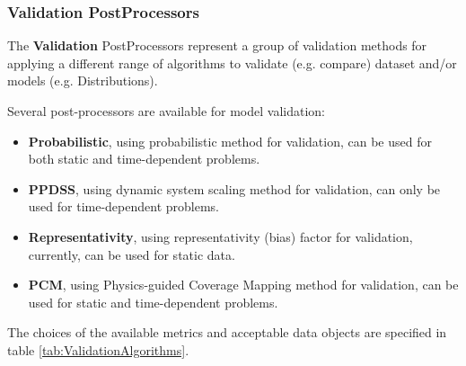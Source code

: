 \subsubsection{Validation PostProcessors}
\label{subsubsec:Validation}

The \textbf{Validation} PostProcessors represent a group of validation methods
for applying a different range of algorithms to validate (e.g. compare)
dataset and/or models (e.g. Distributions).

Several post-processors are available for model validation:
\begin{itemize}
  \item  \textbf{Probabilistic}, using probabilistic method for validation, can be used for both static and time-dependent problems.
  \item  \textbf{PPDSS}, using dynamic system scaling method for validation, can only be used for time-dependent problems.
  \item  \textbf{Representativity}, using representativity (bias) factor for validation, currently, can be used for static data.
  \item  \textbf{PCM}, using Physics-guided Coverage Mapping method for validation, can be used for static and time-dependent problems.
\end{itemize}
%

The choices of the available metrics and acceptable data objects are specified in table \ref{tab:ValidationAlgorithms}.

